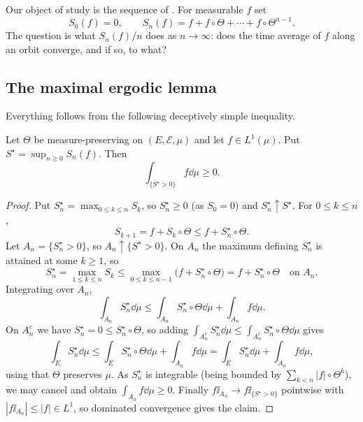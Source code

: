 \documentclass[a4paper]{scrartcl}
\newcommand{\cE}{\mathcal{E}}
\newcommand{\ind}{\ii}
\begin{document}
\begin{center}
\end{center}

Our object of study is the sequence of . For measurable $f$ set
$$
S_0(f)=0, \qquad S_n(f) = f + f\circ\Theta + \cdots+f\circ\Theta^{n-1}.
$$
The question is what $S_n(f)/n$ does as $n \to \infty$: does the time average of $f$ along an orbit converge, and if so, to what?

\subsection{The maximal ergodic lemma}

Everything follows from the following deceptively simple inequality.

\begin{lemma}\label{pm-lem:maximal}
	Let $\Theta$ be measure-preserving on $(E,\cE,\mu)$ and let $f \in L^1(\mu)$. Put $S^\star = \sup_{n\geq0}S_n(f)$. Then
	$$
	\int_{\{S^\star>0\}} f \dd\mu \geq 0.
	$$
\end{lemma}
\begin{proof}
	Put $S_n^\star = \max_{0\leq k\leq n}S_k$, so $S_n^\star \geq 0$ (as $S_0 = 0$) and $S_n^\star \uparrow S^\star$. For $0 \leq k \leq n$,
	$$
	S_{k+1} = f + S_k \circ\Theta \leq f + S_n^\star\circ\Theta.
	$$
	Let $A_n = \{S_n^\star>0\}$, so $A_n \uparrow \{S^\star>0\}$. On $A_n$ the maximum defining $S_n^\star$ is attained at some $k \geq 1$, so
	$$
	S_n^\star = \max_{1\leq k \leq n}S_k \leq \max_{0\leq k\leq n-1}\big(f + S_n^\star\circ\Theta\big) = f + S_n^\star\circ\Theta \quad \text{on } A_n.
	$$
	Integrating over $A_n$,
	$$
	\int_{A_n}S_n^\star\dd\mu \leq \int_{A_n}S_n^\star\circ\Theta\dd\mu + \int_{A_n}f\dd\mu.
	$$
	On $A_n^c$ we have $S_n^\star=0\leq S_n^\star\circ\Theta$, so adding $\int_{A_n^c}S_n^\star\dd\mu \leq \int_{A_n^c}S_n^\star\circ\Theta\dd\mu$ gives
	$$
	\int_E S_n^\star\dd\mu \leq \int_E S_n^\star\circ\Theta\dd\mu+\int_{A_n}f\dd\mu = \int_E S_n^\star\dd\mu + \int_{A_n}f\dd\mu,
	$$
	using that $\Theta$ preserves $\mu$. As $S_n^\star$ is integrable (being bounded by $\sum_{k<n}|f|\circ\Theta^k$), we may cancel and obtain $\int_{A_n}f\dd\mu \geq 0$. Finally $f\ind_{A_n}\to f\ind_{\{S^\star>0\}}$ pointwise with $|f\ind_{A_n}|\leq|f| \in L^1$, so dominated convergence gives the claim.
\end{proof}
\end{document}
